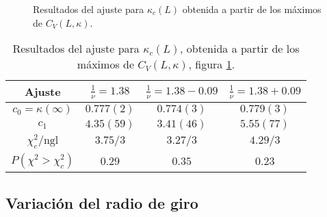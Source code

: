 \begin{figure}[h]
  \centering
  
  \caption{Resultados del ajuste para $\kappa_c(L)$ obtenida a partir de los
  máximos de $C_V(L,\kappa)$.}\label{kappa_Cv_fig}
\end{figure}

\begin{table}[h]
\centering
\begin{tabular}{|c|c|c|c|}\hline
 Ajuste              & $\frac{1}{\nu}=1.38$ & $\frac{1}{\nu}=1.38-0.09$& $\frac{1}{\nu}=1.38+0.09$ \\ \hline\hline
 $c_0=\kappa(\infty)$   & $0.777(2) $          &  $0.774(3)$              &  $0.779(3)$   \\ \hline
 $c_1$              & $4.35(59)$           &  $3.41(46)$              &   $5.55(77)$  \\ \hline
 $\chi_c^2/\mathrm{ngl}$       &  $3.75/3$            &  $3.27/3$                & $4.29/3$  \\ \hline
 $P(\chi^2>\chi_c^2)$&  $0.29$              &  $0.35$                  &   $0.23$ \\ \hline
\end{tabular}
\caption{Resultados del ajuste para $\kappa_c(L)$, obtenida a partir de los
  máximos de $C_V(L,\kappa)$, figura \ref{kappa_Cv_fig}.}\label{kappa_Cv_tab}
\end{table}
\clearpage

\subsection{Variación del radio de giro}

